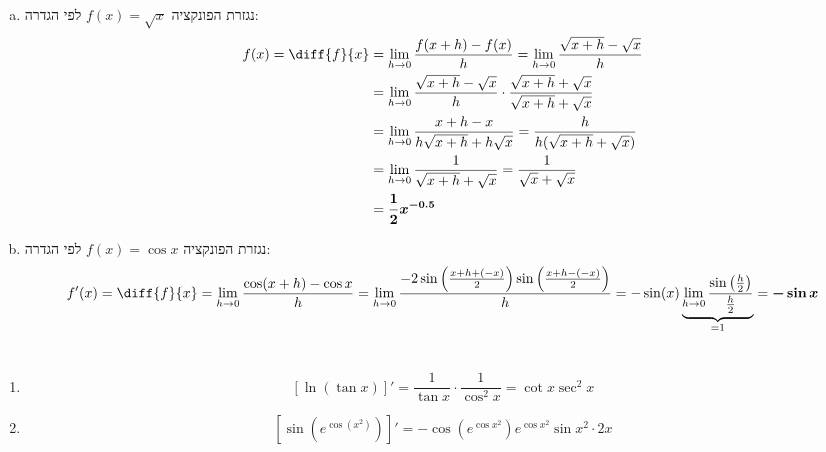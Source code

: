 \documentclass[]{article}
\newcommand\cosx  {\cos x}
\newcommand\cotx  {\cot x}
\newcommand\sinx  {\sin x}
\newcommand\tanx  {\tan x}
\newcommand\dfdx  {\diff{f}{x}}
\newcommand\dit   {\limhz \frac{f(x + h) - f(x)}{h}}
\newcommand\limhz {\lim_{h \to 0}}
\newcommand\limh  {\lim_{h \to 0}}
\newcommand\cl [1]    {\left ( #1 \right )}
\newcommand\csb[1]    {\left [ #1 \right ]}
\begin{document}
	\section{} %
	\begin{enumerate}[a.]
		\item נגזרת הפונקציה $f(x) = \sqrt x$ לפי הגדרה: 
		\begin{align*}
			f(x) = \dfdx &= \dit = \limhz \frac{\sqrt{x + h} - \sqrt{x}}{h} \\
			&= \limh \frac{\sqrt{x + h} - \sqrt{x}}{h} \cdot \frac{\sqrt{x + h} + \sqrt x}{\sqrt{x + h} + \sqrt x} \\
			&= \limh \frac{x + h - x}{h\sqrt{x + h} + h\sqrt{x}} = \frac{h}{h(\sqrt{x + h} + \sqrt{x})} \\
			&= \limh \frac{1}{\sqrt{x + h} + \sqrt x} = \frac{1}{\sqrt x + \sqrt{x}} \\
			&= \bm{\frac{1}{2}x^{-0.5}}
		\end{align*}
		\item נגזרת הפונקציה $f(x) = \cosx$ לפי הגדרה: 
		\begin{align*}
			  f'(x) = \dfdx = \limh \frac{\cos(x + h) - \cosx}{h}
			= \limh \frac{-2 \sin \left ( \frac{x + h + (-x)}{2}\right )\sin\left (\frac{x + h - (-x)}{2}\right )}{h}
			= -\sin(x) \underbrace{\limh\frac{\sin\left (\frac{h}{2}\right )}{\frac{h}{2}}}_{=1} 
			= \bm{-\sinx}
		\end{align*}
	\end{enumerate}
	\section{} %
	\begin{enumerate}
		\item 
		\[ \csb{\ln (\tanx)}' = \frac{1}{\tanx} \cdot \frac{1}{\cos^2x} = \cotx \sec^2x \]
		\item
		\[ \csb{\sin\cl{e^{\cos(x^2)}}}' = -\cos\cl{e^{\cosx^2}} e^{\cos x^2} \sin x^2 \cdot 2x \]
	\end{enumerate}
\end{document}
